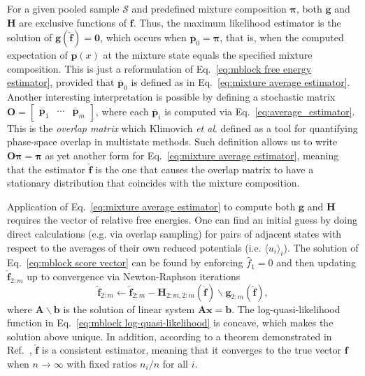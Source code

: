 \documentclass[aip,jcp,reprint,amsmath,amssymb]{revtex4-1}
\newcommand{\mt}[1]{\boldsymbol{\mathbf{#1}}}           %
\newcommand{\vt}[1]{\boldsymbol{\mathbf{#1}}}           %
\begin{document}
For a given pooled sample $\mathcal S$ and predefined mixture composition $\vt \pi$, both $\vt g$ and $\mt H$ are exclusive functions of $\vt f$. Thus, the maximum likelihood estimator is the solution of $\vt g(\hat{\vt f}) = \vt 0$, which occurs when $\overline{\vt p}_0 = \vt \pi$, that is, when the computed expectation of $\vt p(x)$ at the mixture state equals the specified mixture composition. This is just a reformulation of Eq.~\eqref{eq:mblock free energy estimator}, provided that $\overline{\vt p}_0$ is defined as in Eq.~\eqref{eq:mixture average estimator}. Another interesting interpretation is possible by defining a stochastic matrix $\mt O = [\begin{array}{ccc} \overline{\vt p}_1 & \cdots & \overline{\vt p}_m \end{array}]$, where each $\overline{\vt p}_i$ is computed via Eq.~\eqref{eq:average_estimator}. This is the \textit{overlap matrix} which Klimovich \textit{et al}.\cite{Klimovich_2015} defined as a tool for quantifying phase-space overlap in multistate methods. Such definition allows us to write $\mt O \vt \pi = \vt \pi$ as yet another form for Eq.~\eqref{eq:mixture average estimator}, meaning that the estimator $\hat{\vt f}$ is the one that causes the overlap matrix to have a stationary distribution that coincides with the mixture composition.

Application of Eq.~\eqref{eq:mixture average estimator} to compute both $\vt g$ and $\mt H$ requires the vector of relative free energies. One can find an initial guess by doing direct calculations (e.g. via overlap sampling\cite{Lee_1980, Lu_2003}) for pairs of adjacent states with respect to the averages of their own reduced potentials (i.e. $\langle u_i \rangle_i$). The solution of Eq.~\eqref{eq:mblock score vector} can be found by enforcing $\hat f_1 = 0$ and then updating $\hat{\vt f}_{2:m}$ up to convergence via Newton-Raphson iterations\cite{Shirts_2008}
\begin{equation}
\label{eq:mblock Newton-Raphson}
\hat{\vt f}_{2:m} \leftarrow \hat{\vt f}_{2:m} - {\mt H}_{2:m,2:m}(\hat{\vt f}) \backslash {\vt g}_{2:m}(\hat{\vt f}),
\end{equation}
where $\mt A \backslash \vt b$ is the solution of linear system $\mt A \vt x = \vt b$. The log-quasi-likelihood function in Eq.~\eqref{eq:mblock log-quasi-likelihood} is concave,\cite{Doss_2014} which makes the solution above unique. In addition, according to a theorem demonstrated in Ref.~, $\hat{\vt f}$ is a consistent estimator, meaning that it converges to the true vector $\vt f$ when $n \rightarrow \infty$ with fixed ratios $n_i/n$ for all $i$.
\end{document}
